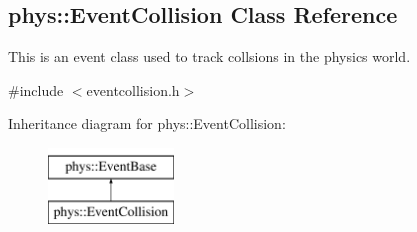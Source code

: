 \hypertarget{classphys_1_1EventCollision}{
\subsection{phys::EventCollision Class Reference}
\label{dd/de9/classphys_1_1EventCollision}
}


This is an event class used to track collsions in the physics world.  




{\ttfamily \#include $<$eventcollision.h$>$}

Inheritance diagram for phys::EventCollision:\begin{figure}[H]
\begin{center}
\leavevmode
\includegraphics[height=2.000000cm]{dd/de9/classphys_1_1EventCollision}
\end{center}
\end{figure}
